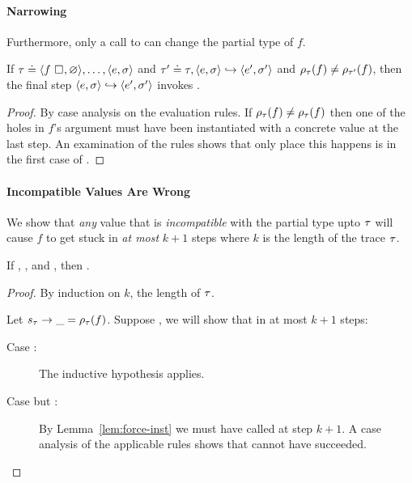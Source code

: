 \paragraph{Narrowing}
%
Furthermore, only a call to \forcesym can change the partial type of $f$.
%
\begin{lem}
\label{lem:force-inst}
If
$\tau \doteq \langle f \ \square_{}, \varnothing \rangle, \ldots,\langle e, \sigma \rangle$
and
$\tau' \doteq \tau, \langle e, \sigma \rangle \hookrightarrow \langle e', \sigma' \rangle$
and
$\rho_{\tau}(f) \neq \rho_{\tau'}(f)$,
then the final step $\langle e, \sigma \rangle \hookrightarrow \langle e', \sigma' \rangle$ invokes \forcesym.
\end{lem}

\begin{proof}
  By case analysis on the evaluation rules.
  If $\rho_{\tau}(f) \neq \rho_{\tau}(f)$ then one of the holes in $f$'s
  argument must have been instantiated with a concrete value at the last step.
  An examination of the rules shows that only place this happens is
  in the first case of \forcesym.
\end{proof}

\paragraph{Incompatible Values Are Wrong}
%
We show that \emph{any} value that is \emph{incompatible} with
the partial type upto $\tau$ will cause $f$ to get stuck
in \emph{at most} $k+1$ steps where $k$ is the length of the
trace $\tau$.
%
\begin{lem}
\label{lem:k-stuck}
  If ,
     , and
     ,
  then
     .
\end{lem}
\begin{proof}
  By induction on $k$, the length of $\tau$.

  Let ${s_{\tau}} \rightarrow \_ = \rho_{\tau}(f)$.
  Suppose , we
  will show that 
  in at most $k+1$ steps:
  \begin{description}
  \item[Case :]
    The inductive hypothesis applies.
  \item[Case  but :]
    By Lemma~\ref{lem:force-inst} we must have called \forcesym at step
    $k+1$.
    A case analysis of the applicable rules shows that \forcesym cannot
    have succeeded.
  \end{description}
\end{proof}

